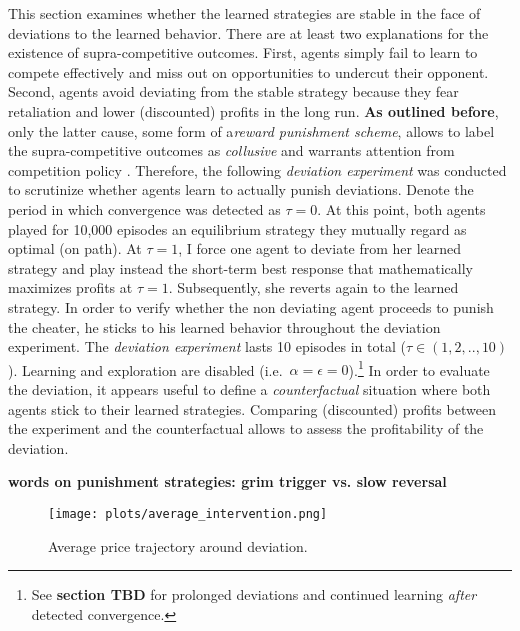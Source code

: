 This section examines whether the learned strategies are stable in the face of deviations to the learned behavior. There are at least two explanations for the existence of supra-competitive outcomes. First, agents simply fail to learn to compete effectively and miss out on opportunities to undercut their opponent. Second, agents avoid deviating from the stable strategy because they fear retaliation and lower (discounted) profits in the long run. \textbf{As outlined before}, only the latter cause, some form of a\emph{reward punishment scheme}, allows to label the supra-competitive outcomes as \emph{collusive} and warrants attention from competition policy \parencite{assad_algorithmic_2020}. Therefore, the following \emph{deviation experiment} was conducted to scrutinize whether agents learn to actually punish deviations. Denote the period in which convergence was detected as $\tau = 0$. At this point, both agents played for 10,000 episodes an equilibrium strategy they mutually regard as optimal (on path). At $\tau = 1$, I force one agent to deviate from her learned strategy and play instead the short-term best response that mathematically maximizes profits at $\tau = 1$. Subsequently, she reverts again to the learned strategy. In order to verify whether the non deviating agent proceeds to punish the cheater, he sticks to his learned behavior throughout the deviation experiment. The \emph{deviation experiment} lasts 10 episodes in total ($\tau \in (1, 2, .., 10)$). Learning and exploration are disabled (i.e.\ $\alpha = \epsilon = 0$).\footnote{See \textbf{section TBD} for prolonged deviations and continued learning \emph{after} detected convergence.} In order to evaluate the deviation, it appears useful to define a \emph{counterfactual} situation where both agents stick to their learned strategies. Comparing (discounted) profits between the experiment and the counterfactual allows to assess the profitability of the deviation.

\textbf{words on punishment strategies: grim trigger vs. slow reversal }

\begin{figure}
	\texttt{[image: plots/average\_intervention.png]}
	\caption{Average price trajectory around deviation. }
	\label{average_intervention}
\end{figure}


